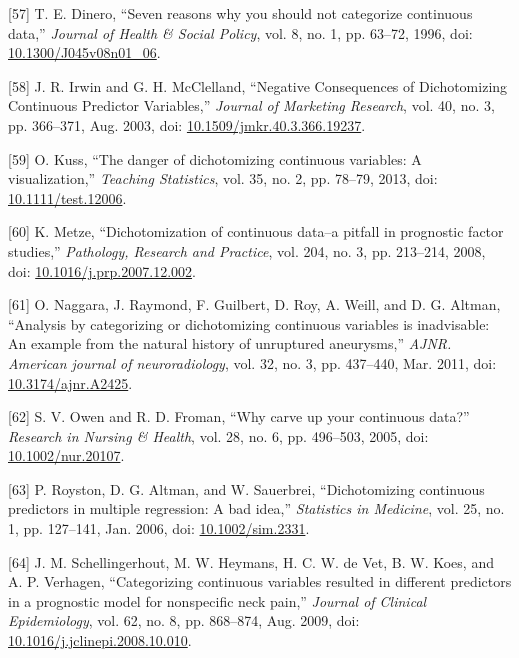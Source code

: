 \documentclass[12pt,PhD,twoside,openright]{muthesis}
\newenvironment{cslreferences}%
  {}%
  {\par}
\begin{document}
\begin{cslreferences}
\leavevmode\hypertarget{ref-dinero_seven_1996-1}{}%
{[}57{]} T. E. Dinero, ``Seven reasons why you should not categorize continuous data,'' \emph{Journal of Health \& Social Policy}, vol. 8, no. 1, pp. 63--72, 1996, doi: \href{https://doi.org/10.1300/J045v08n01_06}{10.1300/J045v08n01\_06}.

\leavevmode\hypertarget{ref-irwin_negative_2003}{}%
{[}58{]} J. R. Irwin and G. H. McClelland, ``Negative Consequences of Dichotomizing Continuous Predictor Variables,'' \emph{Journal of Marketing Research}, vol. 40, no. 3, pp. 366--371, Aug. 2003, doi: \href{https://doi.org/10.1509/jmkr.40.3.366.19237}{10.1509/jmkr.40.3.366.19237}.

\leavevmode\hypertarget{ref-kuss_danger_2013}{}%
{[}59{]} O. Kuss, ``The danger of dichotomizing continuous variables: A visualization,'' \emph{Teaching Statistics}, vol. 35, no. 2, pp. 78--79, 2013, doi: \href{https://doi.org/10.1111/test.12006}{10.1111/test.12006}.

\leavevmode\hypertarget{ref-metze_dichotomization_2008}{}%
{[}60{]} K. Metze, ``Dichotomization of continuous data--a pitfall in prognostic factor studies,'' \emph{Pathology, Research and Practice}, vol. 204, no. 3, pp. 213--214, 2008, doi: \href{https://doi.org/10.1016/j.prp.2007.12.002}{10.1016/j.prp.2007.12.002}.

\leavevmode\hypertarget{ref-naggara_analysis_2011}{}%
{[}61{]} O. Naggara, J. Raymond, F. Guilbert, D. Roy, A. Weill, and D. G. Altman, ``Analysis by categorizing or dichotomizing continuous variables is inadvisable: An example from the natural history of unruptured aneurysms,'' \emph{AJNR. American journal of neuroradiology}, vol. 32, no. 3, pp. 437--440, Mar. 2011, doi: \href{https://doi.org/10.3174/ajnr.A2425}{10.3174/ajnr.A2425}.

\leavevmode\hypertarget{ref-owen_why_2005}{}%
{[}62{]} S. V. Owen and R. D. Froman, ``Why carve up your continuous data?'' \emph{Research in Nursing \& Health}, vol. 28, no. 6, pp. 496--503, 2005, doi: \href{https://doi.org/10.1002/nur.20107}{10.1002/nur.20107}.

\leavevmode\hypertarget{ref-royston_dichotomizing_2006}{}%
{[}63{]} P. Royston, D. G. Altman, and W. Sauerbrei, ``Dichotomizing continuous predictors in multiple regression: A bad idea,'' \emph{Statistics in Medicine}, vol. 25, no. 1, pp. 127--141, Jan. 2006, doi: \href{https://doi.org/10.1002/sim.2331}{10.1002/sim.2331}.

\leavevmode\hypertarget{ref-schellingerhout_categorizing_2009}{}%
{[}64{]} J. M. Schellingerhout, M. W. Heymans, H. C. W. de Vet, B. W. Koes, and A. P. Verhagen, ``Categorizing continuous variables resulted in different predictors in a prognostic model for nonspecific neck pain,'' \emph{Journal of Clinical Epidemiology}, vol. 62, no. 8, pp. 868--874, Aug. 2009, doi: \href{https://doi.org/10.1016/j.jclinepi.2008.10.010}{10.1016/j.jclinepi.2008.10.010}.


\end{cslreferences}
\end{document}
